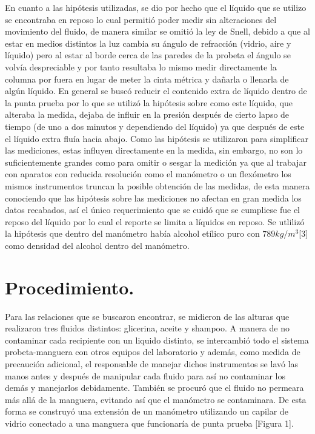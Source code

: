 \documentclass[a4paper]{article}
\begin{document}
En cuanto a las hipótesis utilizadas, se dio por hecho que el líquido que se utilizo se encontraba en reposo lo cual permitió poder medir sin alteraciones del movimiento del fluido, de manera similar se omitió la ley de Snell, debido a que al estar en medios distintos la luz cambia su ángulo de refracción (vidrio, aire y líquido) pero al estar al borde cerca de las paredes de la probeta el ángulo se volvía despreciable y por tanto resultaba lo mismo medir directamente la columna por fuera en lugar de meter la cinta métrica y dañarla o llenarla de algún líquido. En general se buscó reducir el contenido extra de líquido dentro de la punta prueba por lo que se utilizó la hipótesis sobre como este líquido, que alteraba la medida, dejaba de influir en la presión después de cierto lapso de tiempo (de uno a dos minutos y dependiendo del líquido) ya que después de este el líquido extra fluía hacia abajo. Como las hipótesis se utilizaron para simplificar las mediciones, estas influyen directamente en la medida, sin embargo, no son lo suficientemente grandes como para omitir o sesgar la medición ya que al trabajar con aparatos con reducida resolución como el manómetro o un flexómetro los mismos instrumentos truncan la posible obtención de las medidas, de esta manera conociendo que las hipótesis sobre las mediciones no afectan en gran medida los datos recabados, así el único requerimiento que se cuidó que se cumpliese fue el reposo del líquido por lo cual el reporte se limita a líquidos en reposo. Se utlilizó la hipótesis que dentro del manómetro había alcohol etílico puro con $789 kg/m^3$[3] como densidad del alcohol dentro del manómetro.

\section*{Procedimiento.}
Para las relaciones que se buscaron encontrar, se midieron de las alturas que realizaron tres fluidos distintos: glicerina, aceite y shampoo. A manera de no contaminar cada recipiente con un liquido distinto, se intercambió todo el sistema probeta-manguera con otros equipos del laboratorio y además, como medida de precaución adicional, el responsable de manejar dichos instrumentos se lavó las manos antes y después de manipular cada fluido para así no contaminar los demás y manejarlos debidamente. También se procuró que el fluido no permeara más allá de la manguera, evitando así que el manómetro se contaminara. De esta forma se construyó una extensión de un manómetro utilizando un capilar de vidrio conectado a una manguera que funcionaría de punta prueba [Figura 1].
\end{document}
